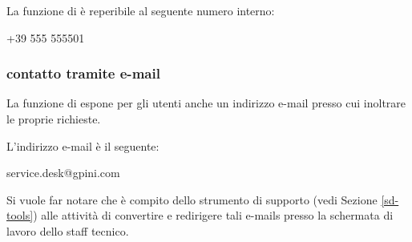 La funzione di  è reperibile al seguente numero interno:

\begin{center}
+39 555 555501
\end{center}

\subsubsection[Contatto tramite e-mail]{contatto tramite e-mail}
La funzione di  espone per gli utenti anche un indirizzo e-mail presso cui inoltrare le proprie richieste.

L'indirizzo e-mail è il seguente:

\begin{center}
service.desk@gpini.com
\end{center}

Si vuole far notare che è compito dello strumento di supporto (vedi Sezione \ref{sd-tools}) alle attività di  convertire e redirigere tali e-mails presso la schermata di lavoro dello staff tecnico.